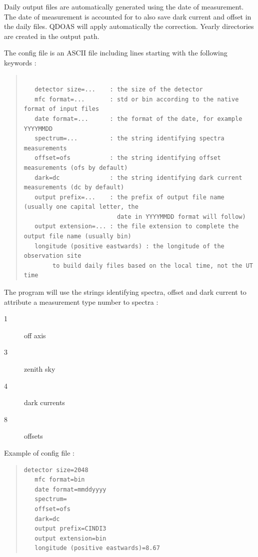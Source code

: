 Daily output files are automatically generated
using the date of measurement.  The date of measurement is accounted for to also save dark current and offset in the daily files.  QDOAS will apply automatically the correction.  Yearly directories are created
in the output path.

The config file is an ASCII file including lines starting with the
following keywords :

\begin{quote}
\begin{Verbatim}[fontfamily=courier,fontsize=\relsize{-4}]

   detector size=...    : the size of the detector
   mfc format=...       : std or bin according to the native format of input files
   date format=...      : the format of the date, for example YYYYMMDD
   spectrum=...         : the string identifying spectra measurements
   offset=ofs           : the string identifying offset measurements (ofs by default)
   dark=dc              : the string identifying dark current measurements (dc by default)
   output prefix=...    : the prefix of output file name (usually one capital letter, the 
                          date in YYYYMMDD format will follow)
   output extension=... : the file extension to complete the output file name (usually bin)
   longitude (positive eastwards) : the longitude of the observation site
        to build daily files based on the local time, not the UT time

\end{Verbatim}
\end{quote}

The program will use the strings identifying spectra, offset and dark
current to attribute a measurement type number to spectra :

\begin{description}
\item[1] off axis
\item[3] zenith sky
\item[4] dark currents
\item[8] offsets
  \end{description}

Example of config file :

\begin{quote}
\begin{Verbatim}[fontfamily=courier,fontsize=\relsize{-4}]
   detector size=2048
   mfc format=bin
   date format=mmddyyyy
   spectrum=
   offset=ofs
   dark=dc
   output prefix=CINDI3
   output extension=bin
   longitude (positive eastwards)=8.67
\end{Verbatim}
\end{quote}

